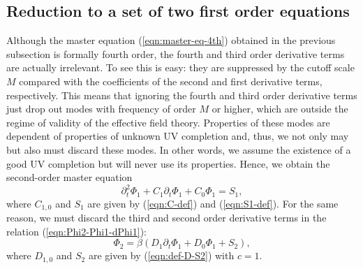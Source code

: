 \subsection{Reduction to a set of two first order equations}
\label{subsec:reduction}


Although the master equation (\ref{eqn:master-eq-4th}) obtained in the
previous subsection is formally fourth order, the fourth and third order
derivative terms are actually irrelevant. To see this is easy: they are
suppressed by the cutoff scale $M$ compared with the coefficients of the
second and first derivative terms, respectively. This means that
ignoring the fourth and third order derivative terms just drop out modes
with frequency of order $M$ or higher, which are outside the regime of
validity of the effective field theory. Properties of these modes are
dependent of properties of unknown UV completion and, thus, we not only
may but also must discard these modes. In other words, we assume the
existence of a good UV completion but will never use its
properties. Hence, we obtain the second-order master equation 
%
\begin{equation}
 \partial_t^2\Phi_1 + C_1\partial_t\Phi_1 + C_0\Phi_1 = S_1,
  \label{eqn:master-eq-2nd}
\end{equation}
where $C_{1,0}$ and $S_1$ are given by (\ref{eqn:C-def}) and
(\ref{eqn:S1-def}). For the same reason, we must discard the third and
second order derivative terms in the relation
(\ref{eqn:Phi2-Phi1-dPhi1}): 
%
\begin{equation}
 \Phi_2 = \beta\left(D_1\partial_t\Phi_1 + D_0\Phi_1 + S_2\right),
  \label{eqn:Phi2-Phi1-dPhi1-1st}
\end{equation}
where $D_{1,0}$ and $S_2$ are given by (\ref{eqn:def-D-S2}) with $c=1$. 


